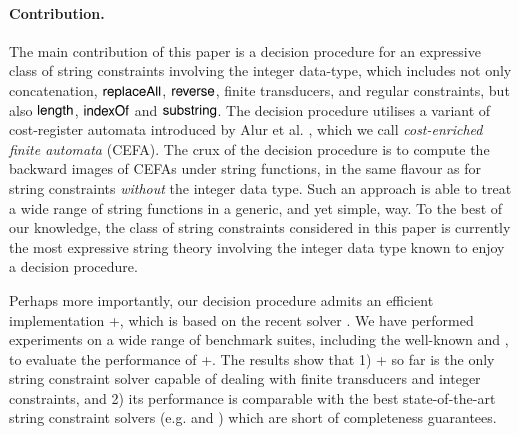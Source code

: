 \paragraph*{Contribution.} The main contribution of this paper is a decision procedure for an expressive class of string constraints involving the integer data-type, which includes not only concatenation, $\mathsf{replaceAll}$, $\mathsf{reverse}$, finite transducers, and regular constraints, but also $\mathsf{length}$, $\mathsf{indexOf}$ and $\mathsf{substring}$. The decision procedure utilises a variant of cost-register automata introduced by Alur et al. \cite{RLJ+13}, which we call \emph{cost-enriched finite automata} (CEFA). The crux of the decision procedure is to compute the backward images of CEFAs under string functions,  in the same flavour as \cite{CHL+19} for string constraints \emph{without} the integer data type. Such an approach %
is able to treat %
a wide range of string functions in a generic, and yet simple, way. To the best of our knowledge, the class of string constraints considered in this paper is currently the most expressive string theory involving the integer data type known to enjoy a decision procedure.

Perhaps more importantly, our decision procedure admits an efficient implementation {\ostrich}+, which is based on %
the recent {\ostrich} solver \cite{CHL+19}.  We have performed experiments on a wide range of benchmark suites, including the well-known {\kaluzabench} and {\pyexbench}, to evaluate the performance of {\ostrich}+. The results show that  %
1) {\ostrich}+ so far is the only string constraint solver capable of dealing with finite transducers and integer constraints, and 2) its performance is comparable with the best state-of-the-art string constraint solvers (e.g. {\cvc} and {\zthreetrau}) which are short of completeness guarantees. 



%
